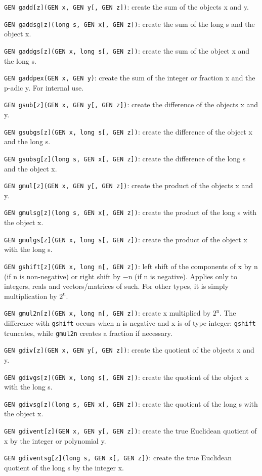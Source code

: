 {\tt GEN gadd[z](GEN x, GEN y[, GEN z])}: create the sum of the objects x and 
y.

{\tt GEN gaddsg[z](long s, GEN x[, GEN z])}: create the sum of the long s and 
the object x.

{\tt GEN gaddgs[z](GEN x, long s[, GEN z])}: create the sum of the object x 
and the long s.

{\tt GEN gaddpex(GEN x, GEN y)}: create the sum of the integer or fraction x
and the p-adic y. For internal use.

{\tt GEN gsub[z](GEN x, GEN y[, GEN z])}: create the difference of the objects
x and y.

{\tt GEN gsubgs[z](GEN x, long s[, GEN z])}: create the difference of the 
object x and the long s.

{\tt GEN gsubsg[z](long s, GEN x[, GEN z])}: create the difference of the long
s and the object x.

{\tt GEN gmul[z](GEN x, GEN y[, GEN z])}: create the product of the objects x 
and y.

{\tt GEN gmulsg[z](long s, GEN x[, GEN z])}: create the product of the long s 
with the object x.

{\tt GEN gmulgs[z](GEN x, long s[, GEN z])}: create the product of the object
x with the long s.

{\tt GEN gshift[z](GEN x, long n[, GEN z])}: left shift of the components of
x by n (if n is non-negative) or right shift by $-$n (if n is negative). Applies
only to integers, reals and vectors/matrices of such. For other types, it is 
simply multiplication by $2^{\text{n}}$.

{\tt GEN gmul2n[z](GEN x, long n[, GEN z])}: create x multiplied by 
$2^{\text{n}}$. The difference with {\tt gshift} occurs when n is negative and
x is of type integer: {\tt gshift} truncates, while {\tt gmul2n} creates a
fraction if necessary.

{\tt GEN gdiv[z](GEN x, GEN y[, GEN z])}: create the quotient of the objects 
x and y.

{\tt GEN gdivgs[z](GEN x, long s[, GEN z])}: create the quotient of the object
x with the long s.

{\tt GEN gdivsg[z](long s, GEN x[, GEN z])}: create the quotient of the long s
with the object x.

{\tt GEN gdivent[z](GEN x, GEN y[, GEN z])}: create the true Euclidean 
quotient of x by the integer or polynomial y.

{\tt GEN gdiventsg[z](long s, GEN x[, GEN z])}: create the true Euclidean 
quotient of the long s by the integer x.

